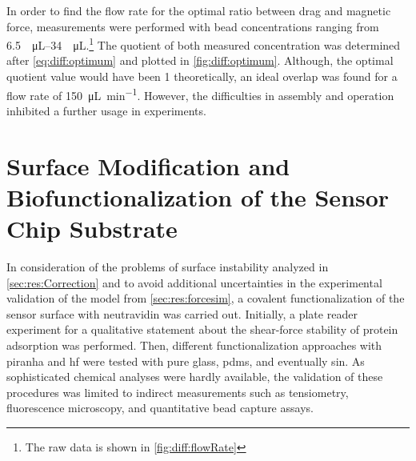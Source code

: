 In order to find the flow rate for the optimal ratio between drag and magnetic force, measurements were performed with bead concentrations ranging from \SIrange{6.5}{34}{\per\micro\liter}.\footnote{The raw data is shown in \cref{fig:diff:flowRate}} The quotient of both measured concentration was determined after \cref{eq:diff:optimum} and plotted in \cref{fig:diff:optimum}. Although, the optimal quotient value would have been \num{1} theoretically, an ideal overlap was found for a flow rate of \SI{150}{\micro\liter\per\minute}. However, the difficulties in assembly and operation inhibited a further usage in experiments.


\clearpage
\section{Surface Modification and Biofunctionalization of the Sensor Chip Substrate}
In consideration of the problems of surface instability analyzed in \cref{sec:res:Correction} and to avoid additional uncertainties in the experimental validation of the model from \cref{sec:res:forcesim}, a covalent functionalization of the sensor surface with neutravidin was carried out. Initially, a plate reader experiment for a qualitative statement about the shear-force stability of protein adsorption was performed. Then, different functionalization approaches with \gls{piranha} and \gls{hf} were tested with pure glass, \gls{pdms}, and eventually \gls{sin}. As sophisticated chemical analyses were hardly available, the validation of these procedures was limited to indirect measurements such as tensiometry, fluorescence microscopy, and quantitative bead capture assays.

